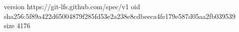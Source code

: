 version https://git-lfs.github.com/spec/v1
oid sha256:5f89a422d65004879f285fd53e2a238e8cdbeeca4fe179e587d05aa2fb039539
size 4176
